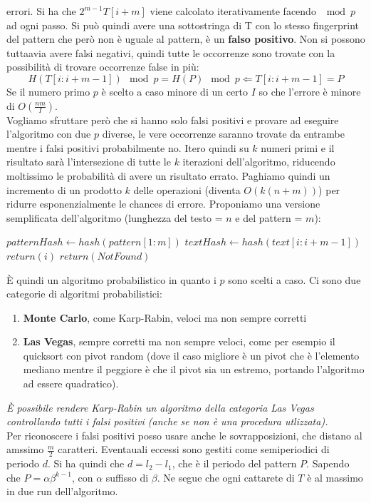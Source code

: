 \documentclass[a4paper,12pt, oneside]{book}
\begin{document}
errori. Si ha che $  2^{m-1} T [i + m]$ viene calcolato iterativamente facendo
$\mod p$ ad ogni passo. Si può quindi avere una sottostringa di T con lo stesso
fingerprint del pattern che però non è uguale al pattern,
è un \textbf{falso positivo}. Non si possono tuttaavia avere falsi negativi,
quindi tutte le occorrenze sono trovate con la possibilità di trovare occorrenze
false in più:
\[H(T [i : i + m - 1]) \mod p = H(P) \mod p \Leftarrow T [i : i + m - 1] = P\]
Se il numero primo $p$ è scelto a caso minore di un certo $I$ so che
l'errore è minore di $O(\frac{nm}{I})$.\\
Vogliamo sfruttare però che si hanno solo falsi positivi e provare ad
eseguire l'algoritmo con due $p$ diverse, le vere occorrenze saranno
trovate da entrambe mentre i falsi positivi probabilmente no. Itero
quindi su $k$ numeri primi e il risultato sarà l'intersezione di tutte
le $k$ iterazioni dell'algoritmo, riducendo moltissimo le probabilità di
avere un risultato errato. Paghiamo quindi un incremento di un prodotto
$k$ delle operazioni (diventa $O(k(n+m))$) per ridurre esponenzialmente
le chances di errore.
\newpage
Proponiamo una versione semplificata dell'algoritmo (lunghezza del
testo = $n$ e del pattern = $m$):
\begin{shaded}
  \begin{algorithmic}
    \State $patternHash \gets hash(pattern[1:m])$
    \State $textHash \gets hash(text[i : i + m - 1])$
    \State $return(i)$
    \EndIf
    \EndIf
    \EndFor
    \State $return(NotFound)$
    \EndFunction
  \end{algorithmic}
\end{shaded}
È quindi un algoritmo probabilistico in quanto i $p$ sono scelti a
caso. Ci sono due categorie di algoritmi probabilistici:
\begin{enumerate}
  \item \textbf{Monte Carlo}, come Karp-Rabin, veloci ma non sempre
  corretti
  \item \textbf{Las Vegas}, sempre corretti ma non sempre veloci, come
  per esempio il quicksort con pivot random (dove il caso migliore è un 
  pivot che è l'elemento mediano mentre il peggiore è che il pivot 
  sia un estremo, portando l'algoritmo ad essere quadratico).
\end{enumerate}
\textit{È possibile rendere Karp-Rabin un algoritmo della categoria Las Vegas
  controllando tutti i falsi positivi (anche se non è una procedura
  utlizzata).} \\
Per riconoscere i falsi positivi posso usare anche le sovrapposizioni,
che distano al amssimo $\frac{m}{2}$ caratteri. Eventauali eccessi
sono gestiti come semiperiodici di periodo $d$. Si ha quindi che
$d=l_2-l_1$, che è il periodo del pattern $P$. Sapendo che
$P=\alpha\beta^{k-1}$, con $\alpha$ suffisso di $\beta$. Ne segue che
ogni cattarete di $T$ è al massimo in due run dell'algoritmo.
\end{document}
